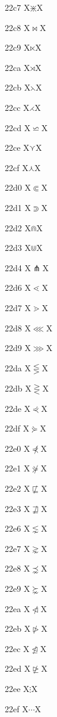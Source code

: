 \documentclass[11pt]{article}
\begin{document}
22c7 X{\ensuremath{\divideontimes}}X

22c8 X{\ensuremath{\bowtie}}X

22c9 X{\ensuremath{\ltimes}}X

22ca X{\ensuremath{\rtimes}}X

22cb X{\ensuremath{\leftthreetimes}}X

22cc X{\ensuremath{\rightthreetimes}}X

22cd X{\ensuremath{\backsimeq}}X

22ce X{\ensuremath{\curlyvee}}X

22cf X{\ensuremath{\curlywedge}}X

22d0 X{\ensuremath{\Subset}}X

22d1 X{\ensuremath{\Supset}}X

22d2 X{\ensuremath{\Cap}}X

22d3 X{\ensuremath{\Cup}}X

22d4 X{\ensuremath{\pitchfork}}X

22d6 X{\ensuremath{\lessdot}}X

22d7 X{\ensuremath{\gtrdot}}X

22d8 X{\ensuremath{\lll}}X

22d9 X{\ensuremath{\ggg}}X

22da X{\ensuremath{\lesseqgtr}}X

22db X{\ensuremath{\gtreqless}}X

22de X{\ensuremath{\curlyeqprec}}X

22df X{\ensuremath{\curlyeqsucc}}X

22e0 X{\ensuremath{\not\curlyeqprec}}X

22e1 X{\ensuremath{\not\curlyeqsucc}}X

22e2 X{\ensuremath{\not\sqsubseteq}}X

22e3 X{\ensuremath{\not\sqsupseteq}}X

22e6 X{\ensuremath{\lnsim}}X

22e7 X{\ensuremath{\gnsim}}X

22e8 X{\ensuremath{\precnsim}}X

22e9 X{\ensuremath{\succnsim}}X

22ea X{\ensuremath{\ntriangleleft}}X

22eb X{\ensuremath{\ntriangleright}}X

22ec X{\ensuremath{\ntrianglelefteq}}X

22ed X{\ensuremath{\ntrianglerighteq}}X

22ee X{\ensuremath{\vdots}}X

22ef X{\ensuremath{\cdots}}X
\end{document}

